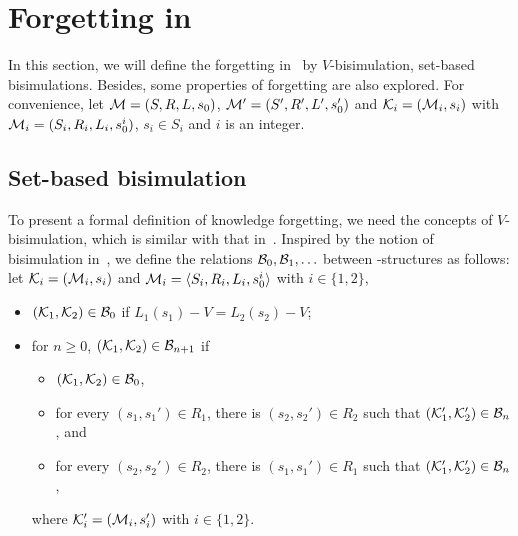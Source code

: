 \documentclass{article}
\begin{document}
\section{Forgetting in \CTL}
In this section, we will define the forgetting in \CTL\ by $V$-bisimulation, set-based bisimulations.
Besides, some properties of forgetting are also explored.
For convenience, let ${\cal M}=(S, R, L, s_0)$, ${\cal M}'=(S',R',L',s_0')$ and ${\cal K}_i=({\cal M}_i, s_i)$ with ${\cal M}_i=(S_i, R_i,L_i, s_0^i)$, $s_i \in S_i$ and $i$ is an integer.
\subsection{Set-based bisimulation}
To present a formal definition of knowledge forgetting, we need the concepts of $V$-bisimulation, which is similar with that in~\cite{Yan:AIJ:2009}.
Inspired by the notion of bisimulation in~\cite{DBLP:journals/tcs/BrowneCG88}, we define the relations ${\cal B}_0,{\cal B}_1,\ldots$
between \MPK-structures as follows: let
${\cal K}_i=({\cal M}_i,s_i)$ and ${\cal M}_i={\langle{S_i, R_i,L_i, s_0^i}\rangle}$ with $i\in\{1,2\}$,
\begin{itemize}
  \item $({\cal K}_1,{\cal K}_2)\in{\cal B}_0$ if $L_1(s_1)-V=L_2(s_2)-V$;  %
  \item for $n\ge 0$, $({\cal K}_1,{\cal K}_2)\in{\cal B}_{n+1}$ if
  \begin{itemize}
    \item $({\cal K}_1,{\cal K}_2)\in{\cal B}_0$,
    \item for every $(s_1,s_1')\in R_1$, there is $(s_2,s_2')\in R_2$
    such that $({\cal K}_1',{\cal K}_2')\in {\cal B}_n$, and 
    \item for every $(s_2,s_2')\in R_2$, there is $(s_1,s_1')\in R_1$
    such that $({\cal K}_1',{\cal K}_2')\in {\cal B}_n$,
  \end{itemize}
  where ${\cal K}_i'=({\cal M}_i,s_i')$ with $i\in\{1,2\}$.
\end{itemize}
\end{document}
